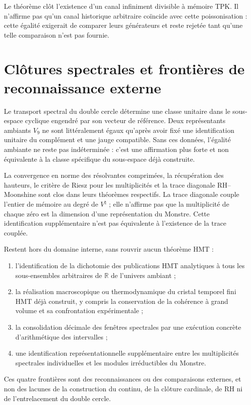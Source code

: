 Le théorème clôt l'existence d'un canal infiniment divisible à
mémoire TPK\@. Il n'affirme pas qu'un canal historique arbitraire coïncide avec cette
poissonisation : cette égalité exigerait de comparer leurs générateurs et reste
rejetée tant qu'une telle comparaison n'est pas fournie.

\section{Clôtures spectrales et frontières de reconnaissance externe}
\label{sec:hmt-final-clausuras-espectrales-externas}

\begin{proposition}
\label{prop:hmt-final-equivalencia-calibrada-vnueve}
Le transport spectral du double cercle détermine une classe unitaire dans le
sous-espace cyclique engendré par son vecteur de référence. Deux représentants
ambiants \(V_9\) ne sont littéralement égaux qu'après avoir fixé une
identification unitaire du complément et une jauge compatible. Sans ces
données, l'égalité ambiante ne reste pas indéterminée : c'est une affirmation plus
forte et non équivalente à la classe spécifique du sous-espace déjà construite.
\end{proposition}

La convergence en norme des résolvantes comprimées, la récupération des
hauteurs, le critère de Riesz pour les multiplicités et la trace diagonale
RH--Moonshine sont clos dans leurs théorèmes respectifs. La trace diagonale
couple l'entier de mémoire au degré de \(V^{\natural}\) ; elle n'affirme pas que la
multiplicité de chaque zéro est la dimension d'une représentation du
Monstre. Cette identification supplémentaire n'est pas équivalente à l'existence de
la trace couplée.

Restent hors du domaine interne, sans rouvrir aucun théorème HMT :
\begin{enumerate}
 \item l'identification de la dichotomie des publications HMT analytiques à
 tous les sous-ensembles arbitraires de \(\mathbb R\) de l'univers ambiant ;
 \item la réalisation macroscopique ou thermodynamique du cristal temporel
 fini HMT déjà construit, y compris la conservation de la cohérence à grand
 volume et sa confrontation expérimentale ;
 \item la consolidation décimale des fenêtres spectrales par une
 exécution concrète d'arithmétique des intervalles ;
 \item une identification représentationnelle supplémentaire entre les multiplicités
 spectrales individuelles et les modules irréductibles du Monstre.
\end{enumerate}
Ces quatre frontières sont des reconnaissances ou des comparaisons externes, et non
 des lacunes de la construction du continu, de la clôture cardinale, de RH ni de
l'entrelacement du double cercle.

